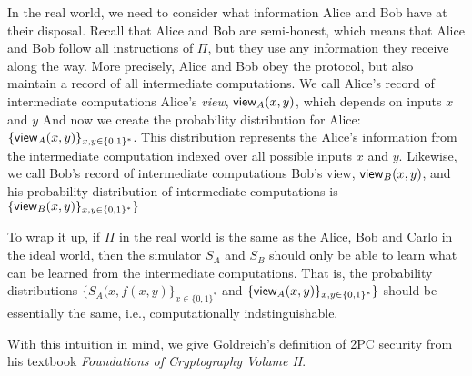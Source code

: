 In the real world, we need to consider what information Alice and Bob have at their disposal.
Recall that Alice and Bob are semi-honest, which means that Alice and Bob follow all instructions of $\Pi$, but they use any information they receive along the way.
More precisely, Alice and Bob obey the protocol, but also maintain a record of all intermediate computations.
We call Alice's record of intermediate computations Alice's \textit{view}, ${\sf view}_A(x, y)$, which depends on inputs $x$ and $y$
And now we create the probability distribution for Alice: $\{{\sf view}_A(x, y)\}_{x, y \in \{0,1\}^*}$.
This distribution represents the Alice's information from the intermediate computation indexed over all possible inputs $x$ and $y$.
Likewise, we call Bob's record of intermediate computations Bob's view,  ${\sf view}_B(x, y)$, and his probability distribution of intermediate computations is $\{{\sf view}_B(x, y)\}_{x,y \in \{0,1\}^*}\}$

To wrap it up, if $\Pi$ in the real world is the same as the Alice, Bob and Carlo in the ideal world, then the simulator $S_A$ and $S_B$ should only be able to learn what can be learned from the intermediate computations. 
That is, the probability distributions $\{S_A(x, f(x,y)\}_{x \in \{0,1\}^*}$ and $\{{\sf view}_A(x, y)\}_{x, y \in \{0,1\}^*}\}$ should be essentially the same, i.e., computationally indstinguishable.

With this intuition in mind, we give Goldreich's definition of 2PC security from his textbook \textit{Foundations of Cryptography Volume II}\cite{goldreich}.

